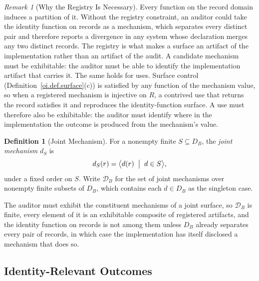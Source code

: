 \documentclass[11pt]{article}
\theoremstyle{plain}
\theoremstyle{definition}
\newtheorem{definition}[theorem]{Definition}
\theoremstyle{remark}
\newtheorem{remark}[theorem]{Remark}
\begin{document}
\begin{remark}[Why the Registry Is Necessary]
  \label{oi.rem.registry}
  Every function on the record domain induces a partition of it.
  Without the registry constraint,
  an auditor could take the identity function on records as a mechanism,
  which separates every distinct pair
  and therefore reports a divergence in any system
  whose declaration merges any two distinct records.
  The registry is what makes a surface an artifact of the implementation
  rather than an artifact of the audit.
  A candidate mechanism must be exhibitable:
  the auditor must be able to identify the implementation artifact that carries it.
  The same holds for uses.
  Surface control (Definition~\ref{oi.def.surface}(c)) is satisfied
  by any function of the mechanism value,
  so when a registered mechanism is injective on \(R\),
  a contrived use that returns the record satisfies it
  and reproduces the identity-function surface.
  A use must therefore also be exhibitable:
  the auditor must identify where in the implementation
  the outcome is produced from the mechanism's value.
\end{remark}

\begin{definition}[Joint Mechanism]
  \label{oi.def.joint}
  For a nonempty finite \(S\subseteq D_B\), the \emph{joint mechanism} \(d_S\) is
  \[
    d_S(r)
    =
    \bigl\langle d(r) \;\bigm|\; d\in S \bigr\rangle,
  \]
  under a fixed order on \(S\).
  Write \(\mathcal{D}_B\) for the set of joint mechanisms over nonempty finite subsets of \(D_B\),
  which contains each \(d\in D_B\) as the singleton case.
\end{definition}

The auditor must exhibit the constituent mechanisms of a joint surface,
so \(\mathcal{D}_B\) is finite,
every element of it is an exhibitable composite of registered artifacts,
and the identity function on records is not among them
unless \(D_B\) already separates every pair of records,
in which case the implementation has itself disclosed a mechanism that does so.

\subsection{Identity-Relevant Outcomes}
\end{document}
